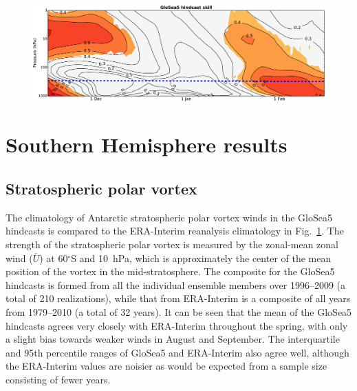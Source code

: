 \begin{figure}[t] \centering
  \noindent\includegraphics[width=\textwidth,angle=0]{figures/chapter-seasonal/NH_lag_height_corr.pdf}\\
  \caption[]{}\label{fig:sh_zmzw_clim}
\end{figure}




\section{Southern Hemisphere results}


\subsection{Stratospheric polar vortex}

The climatology of Antarctic stratospheric polar vortex winds in the GloSea5
hindcasts is compared to the ERA-Interim reanalysis climatology in Fig.\
\ref{fig:sh_zmzw_clim}. The strength of the stratospheric polar vortex is
measured by the zonal-mean zonal wind ($\overline{U}$) at 60$^{\circ}$S and
10~hPa, which is approximately the center of the mean position of the vortex in
the mid-stratosphere. The composite for the GloSea5 hindcasts is formed from all
the individual ensemble members over 1996--2009 (a total of 210 realizations),
while that from ERA-Interim is a composite of all years from 1979--2010 (a total
of 32 years). It can be seen that the mean of the GloSea5 hindcasts agrees very
closely with ERA-Interim throughout the spring, with only a slight bias towards
weaker winds in August and September. The interquartile and 95th percentile
ranges of GloSea5 and ERA-Interim also agree well, although the ERA-Interim
values are noisier as would be expected from a sample size consisting of fewer
years.

